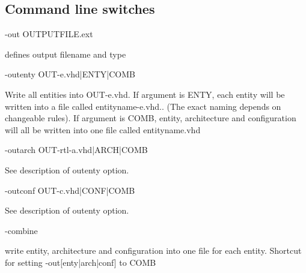 \documentclass[a4paper,12pt]{article}
\begin{document}
\subsection{Command line switches}
\begin{tt}-out OUTPUTFILE.ext\end{tt}\newline
\hspace*{15mm}defines output filename and type\newline
\begin{tt}-outenty OUT-e.vhd|ENTY|COMB\end{tt}\newline
\hspace*{15mm}Write all entities into OUT-e.vhd.\newline
\hspace*{15mm}If argument is ENTY, each entity will be written\newline
\hspace*{15mm}into a file called entityname-e.vhd.. (The exact\newline
\hspace*{15mm}naming depends on changeable rules).\newline
\hspace*{15mm}If argument is COMB, entity, architecture and configuration\newline
\hspace*{15mm}will all be written into one file called entityname.vhd\newline
\begin{tt}-outarch OUT-rtl-a.vhd|ARCH|COMB\end{tt}\newline
\hspace*{15mm}See description of outenty option.\newline
\begin{tt}-outconf OUT-c.vhd|CONF|COMB\end{tt}\newline
\hspace*{15mm}See description of outenty option.\newline
\begin{tt}-combine\end{tt}\newline
\hspace*{15mm}write entity, architecture and configuration into one file for \newline
\hspace*{15mm}each entity. Shortcut for setting -out[enty|arch|conf] to COMB\newline
\end{document}
